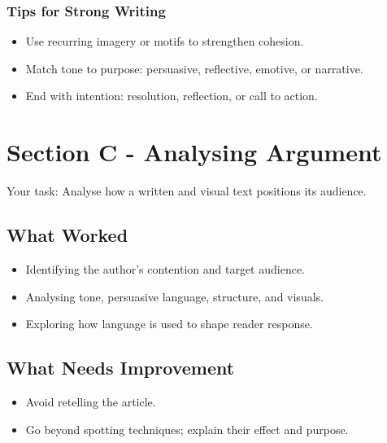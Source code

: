 \documentclass[a4paper]{article}
\begin{document}
\subsubsection{Tips for Strong Writing}
\begin{itemize}
    \item Use recurring imagery or motifs to strengthen cohesion.

\item Match tone to purpose: persuasive, reflective, emotive, or narrative.

\item End with intention: resolution, reflection, or call to action.
\end{itemize}

\newpage
\section{Section C - Analysing Argument}
Your task: Analyse how a written and visual text positions its audience.

\subsection{What Worked}
\begin{itemize}
    \item Identifying the author’s contention and target audience.

\item Analysing tone, persuasive language, structure, and visuals.

\item Exploring how language is used to shape reader response.
\end{itemize}

\subsection{What Needs Improvement}
\begin{itemize}
    \item Avoid retelling the article.

\item Go beyond spotting techniques; explain their effect and purpose.
\end{itemize}
\end{document}
